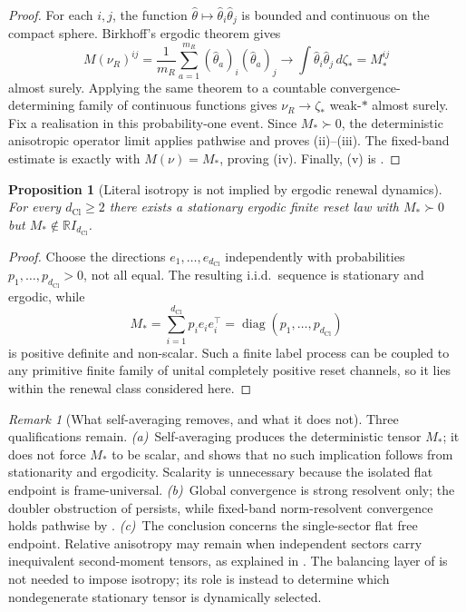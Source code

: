 \documentclass[11pt]{article}
\newtheorem{proposition}[theorem]{Proposition}
\theoremstyle{definition}
\theoremstyle{remark}
\newtheorem{remark}[theorem]{Remark}
\newcommand{\R}{\mathbb{R}}
\newcommand{\dCl}{d_{\mathrm{Cl}}}
\begin{document}
\begin{proof}
For each \(i,j\), the function
\(\hat\theta\mapsto\hat\theta_i\hat\theta_j\) is bounded and continuous on the
compact sphere.  Birkhoff's ergodic theorem gives
\[
 M(\nu_R)^{ij}
 =\frac1{m_R}\sum_{a=1}^{m_R}
   (\hat\theta_a)_i(\hat\theta_a)_j
 \longrightarrow
 \int\hat\theta_i\hat\theta_j\,d\zeta_*
 =M_*^{ij}
\]
almost surely.  Applying the same theorem to a countable
convergence-determining family of continuous functions gives
\(\nu_R\to\zeta_*\) weak-$*$ almost surely.  Fix a realisation in this
probability-one event.  Since \(M_*\succ0\), the deterministic anisotropic
operator limit  applies pathwise and proves
(ii)--(iii).  The fixed-band estimate is exactly
 with \(M(\nu)=M_*\), proving (iv).
Finally, (v) is .
\end{proof}

\begin{proposition}[Literal isotropy is not implied by ergodic renewal dynamics]
\label{prop:isotropy-not-derived}
For every \(\dCl\ge2\) there exists a stationary ergodic finite reset law with
\(M_*\succ0\) but \(M_*\notin\R I_{\dCl}\).
\end{proposition}

\begin{proof}
Choose the directions \(e_1,\ldots,e_{\dCl}\) independently with probabilities
\(p_1,\ldots,p_{\dCl}>0\), not all equal.  The resulting i.i.d.\ sequence is
stationary and ergodic, while
\[
  M_*=\sum_{i=1}^{\dCl}p_i e_ie_i^\top
     =\operatorname{diag}(p_1,\ldots,p_{\dCl})
\]
is positive definite and non-scalar.  Such a finite label process can be
coupled to any primitive finite family of unital completely positive reset
channels, so it lies within the renewal class considered here.
\end{proof}

\begin{remark}[What self-averaging removes, and what it does not]
\label{rem:self-averaging-honest}
Three qualifications remain.  \emph{(a)}~Self-averaging produces the
deterministic tensor \(M_*\); it does not force \(M_*\) to be scalar, and
 shows that no such implication follows from
stationarity and ergodicity.  Scalarity is unnecessary because the isolated
flat endpoint is frame-universal.  \emph{(b)}~Global convergence is strong
resolvent only; the doubler obstruction of
 persists, while fixed-band norm-resolvent
convergence holds pathwise by .
\emph{(c)}~The conclusion concerns the single-sector flat free endpoint.
Relative anisotropy may remain when independent sectors carry inequivalent
second-moment tensors, as explained in
.  The balancing layer of
 is not needed to impose isotropy; its role
is instead to determine which nondegenerate stationary tensor is dynamically
selected.
\end{remark}
\end{document}
